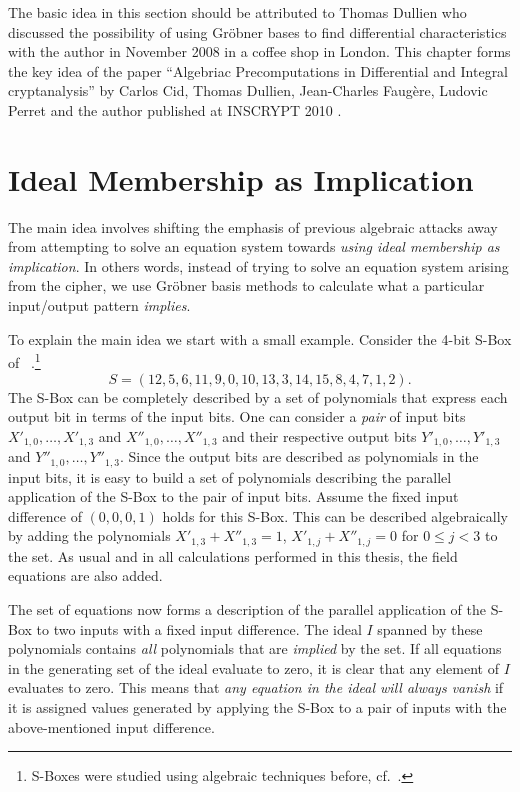 The basic idea in this section should be attributed to Thomas Dullien who discussed the possibility of using Gröbner bases to find differential characteristics with the author in November 2008 in a coffee shop in London. This chapter forms the key idea of the paper ``Algebriac Precomputations in Differential and Integral cryptanalysis'' by Carlos Cid, Thomas Dullien, Jean-Charles Faugère, Ludovic Perret and the author published at INSCRYPT 2010 \cite{acdfp:inscrypt2010}.

\section{Ideal Membership as Implication}

The main idea involves shifting the emphasis of previous algebraic attacks away from attempting to solve an
equation system towards \textit{using ideal membership as implication}. In others words, instead of trying to solve an equation system arising from the cipher, we use Gr\"obner basis methods to calculate what a particular input/output pattern \emph{implies}. 

To explain the main idea we start with a small example. Consider the 4-bit S-Box of \PRESENT~\cite{present}.\footnote{S-Boxes were studied using algebraic techniques before, cf.\ \cite{SK98,ars:thesis2005}.}
$$
S = (12, 5, 6, 11, 9, 0, 10, 13, 3, 14, 15, 8, 4, 7, 1, 2).
$$
The S-Box can be completely described by a set of polynomials that express each output bit in terms of the input bits.  One can consider a \emph{pair} of input bits $X'_{1,0},\dots,X'_{1,3}$ and $X''_{1,0},\dots,X''_{1,3}$ and their respective output bits $Y'_{1,0},\dots,Y'_{1,3}$ and $Y''_{1,0},\dots,Y''_{1,3}$. Since the output bits are described as polynomials in the input bits, it is easy to build a set of polynomials describing the parallel application of the S-Box to the pair of input bits. Assume the fixed input difference of $(0,0,0,1)$ holds for this S-Box. This can be described algebraically by adding the polynomials $X'_{1,3} + X''_{1,3} = 1$, $X'_{1,j}+X''_{1,j}=0$ for $0 \leq j < 3$ to the set. As usual and in all calculations performed in this thesis, the field equations are also added. 

The set of equations now forms a description of the parallel application of the S-Box to two inputs with a fixed input difference. The ideal \(I\) spanned by these polynomials contains \emph{all} polynomials that are \emph{implied} by the set.  If all equations in the generating set of the ideal evaluate to zero, it is clear that any element of \(I\) evaluates to zero. This means that \emph{any equation in the ideal will always vanish} if it is assigned values generated by applying the S-Box to a pair of inputs with the above-mentioned input difference. 

